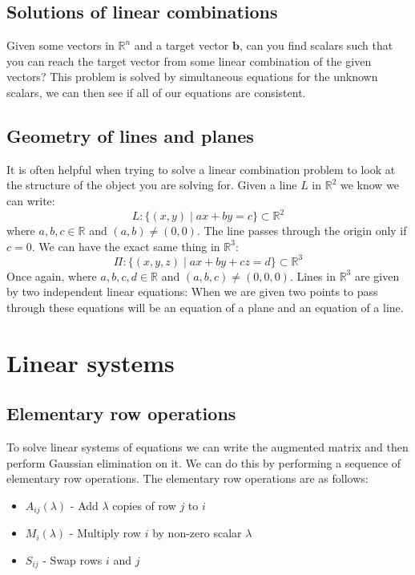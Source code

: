\documentclass[12pt]{article}
\begin{document}
\subsection*{Solutions of linear combinations}
Given some vectors in \(\mathbb{R}^n\) and a target vector \(\textbf{b}\), can you find scalars such that you can reach the target vector from some linear combination of the given vectors? This problem is solved by simultaneous equations for the unknown scalars, we can then see if all of our equations are consistent.
\subsection*{Geometry of lines and planes}
It is often helpful when trying to solve a linear combination problem to look at the structure of the object you are solving for. Given a line \(L\) in \(\mathbb{R}^2\) we know we can write:
\[L:\{(x,y)\;\vert\;ax+by = c\}\subset\mathbb{R}^2\]
where \(a,b,c\in\mathbb{R}\) and \((a,b)\ne(0,0)\). The line passes through the origin only if \(c=0\). We can have the exact same thing in \(\mathbb{R}^3\):
\[\Pi: \{(x,y,z)\;\vert\;ax+by+cz=d\}\subset\mathbb{R}^3\]
Once again, where \(a,b,c,d\in\mathbb{R}\) and \((a,b,c)\ne(0,0,0)\). Lines in \(\mathbb{R}^3\) are given by two independent linear equations: When we are given two points to pass through these equations will be an equation of a plane and an equation of a line.
\section{Linear systems}
\subsection*{Elementary row operations}
To solve linear systems of equations we can write the augmented matrix and then perform Gaussian elimination on it. We can do this by performing a sequence of elementary row operations. The elementary row operations are as follows:
\begin{itemize}
    \item \(A_{ij}(\lambda)\) - Add \(\lambda\) copies of row \(j\) to \(i\)
    \item \(M_i(\lambda)\) - Multiply row \(i\) by non-zero scalar \(\lambda\)
    \item \(S_{ij}\) - Swap rows \(i\) and \(j\)
\end{itemize}
\end{document}
